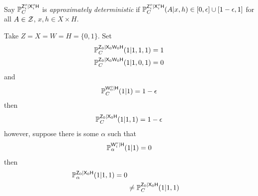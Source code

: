 \begin{example}
Say $\mathbb{P}_C^{\mathsf{Z}^o_i|\mathsf{X}^o_i\mathsf{H}}$ is \emph{approximately deterministic} if $\mathbb{P}_C^{\mathsf{Z}^o_i|\mathsf{X}^o_i\mathsf{H}}(A|x,h)\in [0,\epsilon]\cup[1-\epsilon,1]$ for all $A\in\mathcal{Z}$, $x,h\in X\times H$.

Take $Z=X=W=H=\{0,1\}$. Set
\begin{align}
    \mathbb{P}_C^{\mathsf{Z}_0|\mathsf{X}_0\mathsf{W}_0\mathsf{H}}(1|1,1,1) = 1\\
    \mathbb{P}_C^{\mathsf{Z}_0|\mathsf{X}_0\mathsf{W}_0\mathsf{H}}(1|1,0,1) = 0
\end{align}
and
\begin{align}
    \mathbb{P}_C^{\mathsf{W}^o_0|\mathsf{H}}(1|1)=1-\epsilon
\end{align}
then
\begin{align}
    \mathbb{P}_C^{\mathsf{Z}_0|\mathsf{X}_0\mathsf{H}}(1|1,1) = 1-\epsilon
\end{align}
however, suppose there is some $\alpha$ such that
\begin{align}
    \mathbb{P}_\alpha^{\mathsf{W}^v_i|\mathsf{H}}(1|1)=0
\end{align}
then
\begin{align}
    \mathbb{P}_\alpha^{\mathsf{Z}_0|\mathsf{X}_0\mathsf{H}}(1|1,1) = 0\\
    &\neq \mathbb{P}_C^{\mathsf{Z}_0|\mathsf{X}_0\mathsf{H}}(1|1,1)
\end{align}
\end{example}